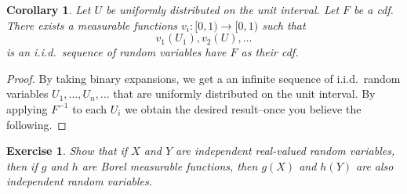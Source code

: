 \documentclass[12pt, reqno]{amsart}
\newtheorem{corollary}[theorem]{Corollary}
\newtheorem{ex}{Exercise}[section]
\renewcommand{\P}{{\mathbb P}}  %
\begin{document}
\begin{corollary}  Let $U$ be uniformly distributed on the unit interval.  Let $F$ be a cdf.    There exists a measurable functions $v_i: [0,1) \to [0,1)$ such that $$v_1(U_1), v_2(U), \ldots$$ is an i.i.d.\ sequence of random variables have $F$ as their cdf.  

\end{corollary}

\begin{proof}
By taking binary expansions, we get a an infinite sequence of i.i.d.\ random variables $U_1, \ldots, U_n, \ldots$ that are uniformly distributed on the unit interval.  By applying $F^{-1}$ to each $U_i$ we obtain the desired result--once you believe the following. 
\end{proof}
  
  \begin{ex}  Show that if $X$ and $Y$ are independent real-valued random variables, then if $g$ and $h$ are Borel measurable functions, then $g(X)$ and $h(Y)$ are also independent random variables.
  \end{ex}

\begin{comment}


\begin{proof}
\begin{eqnarray*}
\P(g (X) \in A, h(Y) \in B) ) & =& \P( X \in g^{-1}(A)  , Y \in h^{-1}(B) )  \\
&=& \P(X \in g^{-1}(A) ) \P(   Y \in h^{-1}(B)) \\ 
&=& \P( g(X) \in A) \P(h(Y) \in B).
\end{eqnarray*}

\end{proof}

\end{comment}
\end{document}
